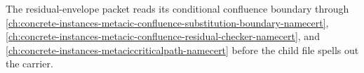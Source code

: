 The residual-envelope packet reads its conditional confluence boundary through \autoref{ch:concrete-instances-metacic-confluence-substitution-boundary-namecert}, \autoref{ch:concrete-instances-metacic-confluence-residual-checker-namecert}, and \autoref{ch:concrete-instances-metaciccriticalpath-namecert} before the child file spells out the carrier.

